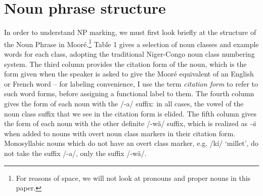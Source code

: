 \documentclass[output=paper]{langsci/langscibook}
\begin{document}
\section{Noun phrase structure}\label{sec:teo:4}
In order to understand NP marking, we must first look briefly at the structure of the Noun Phrase in Mooré.\footnote{For reasons of space, we will not look at pronouns and proper nouns in this paper.} Table 1 gives a selection of noun classes and example words for each class, adopting the traditional Niger-Congo noun class numbering system. The third column provides the citation form of the noun, which is the form given when the speaker is asked to give the Mooré equivalent of an English or French word – for labeling convenience, I use the term \textit{citation form} to refer to such word forms, before assigning a functional label to them. The fourth column gives the form of each noun with the /-a/ suffix: in all cases, the vowel of the noun class suffix that we see in the citation form is elided. The fifth column gives the form of each noun with the other definite /-wã/ suffix, which is realized as \textit{-ã} when added to nouns with overt noun class markers in their citation form. Monosyllabic nouns which do not have an overt class marker, e.g. /kí/ ‘millet’, do not take the suffix /-a/, only the suffix /-wã/.
\end{document}
